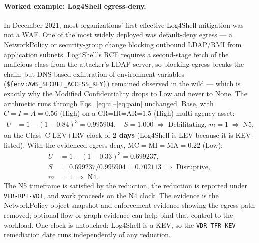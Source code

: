 \documentclass[11pt]{article}
\newcommand{\code}[1]{\texttt{#1}}
\begin{document}
\paragraph{Worked example: Log4Shell egress-deny.} In December 2021, most
organizations' first effective Log4Shell mitigation was not a WAF. One of the most
widely deployed was default-deny egress --- a NetworkPolicy or security-group change
blocking outbound LDAP/RMI from application subnets. Log4Shell's RCE requires a
second-stage fetch of the malicious class from the attacker's LDAP server, so
blocking egress breaks the chain; but DNS-based exfiltration of environment
variables (\code{\$\{env:AWS\_SECRET\_ACCESS\_KEY\}}) remained observed in the wild
--- which is exactly why the Modified Confidentiality drops to Low and never to
None. The arithmetic runs through Eqs.~\eqref{eq:u}--\eqref{eq:pain} unchanged.
Base, with $C\!=\!I\!=\!A\!=\!0.56$ (High) on a CR=IR=AR=$1.5$ (High) multi-agency
asset:
\begin{align*}
U &= 1-(1-0.84)^3 = 0.995904,\quad
S = 1.000 \;\Rightarrow\; \text{Debilitating},\ m=1 \;\Rightarrow\; \text{N5},
\end{align*}
on the Class~C LEV+IRV clock of \textbf{2 days} (Log4Shell is LEV because it is
KEV-listed). With the evidenced egress-deny,
$\mathrm{MC}=\mathrm{MI}=\mathrm{MA}=0.22$ (Low):
\begin{align*}
U &= 1-(1-0.33)^3 = 0.699237,\\
S &= 0.699237/0.995904 = 0.702113
   \;\Rightarrow\; \text{Disruptive},\\
m &= 1 \;\Rightarrow\; \boxed{\text{N4}}.
\end{align*}
The N5 timeframe is satisfied by the reduction, the reduction is reported under
\code{VER-RPT-VDT}, and work proceeds on the N4 clock. The evidence is the
NetworkPolicy object snapshot and enforcement evidence showing the egress path
removed; optional flow or graph evidence can help bind that control to the
workload. One clock is untouched: Log4Shell is a
KEV, so the \code{VDR-TFR-KEV} remediation date runs independently of any
reduction.
\end{document}
